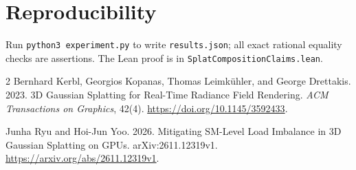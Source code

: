 \documentclass[11pt]{article}
\begin{document}
\section*{Reproducibility}
Run \texttt{python3 experiment.py} to write \texttt{results.json}; all exact rational equality checks are assertions. The Lean proof is in \texttt{SplatCompositionClaims.lean}.

\begin{thebibliography}{2}
Bernhard Kerbl, Georgios Kopanas, Thomas Leimk\"uhler, and George Drettakis. 2023.
3D Gaussian Splatting for Real-Time Radiance Field Rendering.
\textit{ACM Transactions on Graphics}, 42(4).
\url{https://doi.org/10.1145/3592433}.

Junha Ryu and Hoi-Jun Yoo. 2026.
Mitigating SM-Level Load Imbalance in 3D Gaussian Splatting on GPUs.
arXiv:2611.12319v1. \url{https://arxiv.org/abs/2611.12319v1}.
\end{thebibliography}
\end{document}
